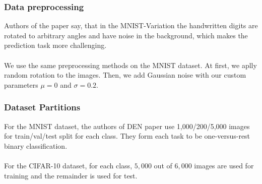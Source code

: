 \documentclass[12pt]{article}
\begin{document}
    \subsubsection{Data preprocessing}
    Authors of the paper say, that in the MNIST-Variation the handwritten digits are rotated to
    arbitrary angles and have noise in the background, which makes the prediction task more challenging.
    \\
    \\
    We use the same preprocessing methods on the MNIST dataset. At first, we aplly random rotation
    to the images. Then, we add Gaussian noise with our custom parameters $\mu = 0$ and $\sigma = 0.2$.
    
    \subsubsection{Dataset Partitions}
    For the MNIST dataset, the authors of DEN paper use 1,000/200/5,000 images for
    train/val/test split for each class.
    They form each task to be one-versus-rest binary classification.
    \\
    \\
    For the CIFAR-10 dataset, for each class, $5,000$ out of $6,000$ images are used for training and the remainder
    is used for test.
    
\end{document}
